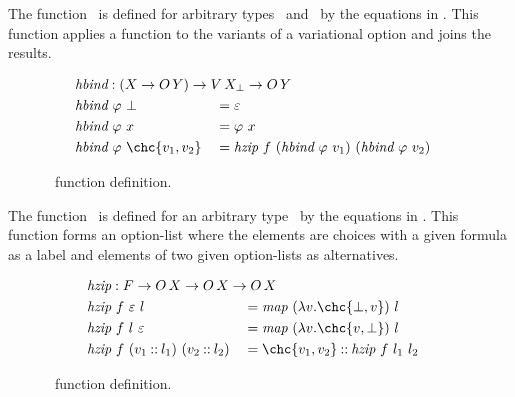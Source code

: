 The function \hbind\ is defined for arbitrary types \Val\ and \ValY\ by the equations in .
This function applies a function to the variants of a variational option and joins the results.

\begin{figure}[H]
  \onehalfspacing
  \begin{alignat*}{2}
    &\mathrlap{\hbind : (\Val \to \OLst[\ValY]) \to \Var \to \OLst[\ValY]} \\
    &\hbind\ \varphi\ \Bot &&= \nil \\
    &\hbind\ \varphi\ \val &&= \varphi\ \val \\
    &\hbind\ \varphi\ \chc{\var_1, \var_2}
    &&= \hzip\ \fE\ (\hbind\ \varphi\ \var_1)\ (\hbind\ \varphi\ \var_2)
  \end{alignat*}
  \caption{\hbind\ function definition.}
  \label{fig:hbind}
\end{figure}

The function \hzip\ is defined for an arbitrary type \Val\ by the equations in .
This function forms an option-list where the elements are choices with a given formula as a label and elements of two given option-lists as alternatives.

\begin{figure}[H]
  \onehalfspacing
  \begin{alignat*}{2}
    &\mathrlap{\hzip : \fS \to \OLst \to \OLst \to \OLst} \\
    &\hzip\ \fE\ \nil\ \lst
    &&= \lmap\ (\lam{\var}{\chc{\Bot, \var}})\ \lst \\
    &\hzip\ \fE\ \lst\ \nil
    &&= \lmap\ (\lam{\var}{\chc{\var, \Bot}})\ \lst \\
    &\hzip\ \fE\ (\var_1\cons\lst_1)\ (\var_2\cons\lst_2)
    &&= \chc{\var_1, \var_2} \cons\hzip\ \fE\ \lst_1\ \lst_2
  \end{alignat*}
  \caption{\hzip\ function definition.}
  \label{fig:ozip}
\end{figure}

